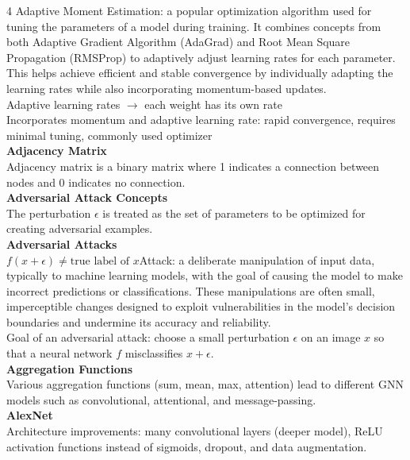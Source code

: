 \documentclass[8pt]{extarticle}
\begin{document}
\begin{multicols}{4}
Adaptive Moment Estimation: a popular optimization algorithm used for tuning the parameters of a model during training. It combines concepts from both Adaptive Gradient Algorithm (AdaGrad) and Root Mean Square Propagation (RMSProp) to adaptively adjust learning rates for each parameter. This helps achieve efficient and stable convergence by individually adapting the learning rates while also incorporating momentum-based updates.\\
Adaptive learning rates $\rightarrow$ each weight has its own rate\\
Incorporates momentum and adaptive learning rate: rapid convergence, requires minimal tuning, commonly used optimizer\\
\vspace{2pt}\textbf{Adjacency Matrix}\\
Adjacency matrix is a binary matrix where 1 indicates a connection between nodes and 0 indicates no connection.\\
\vspace{2pt}\textbf{Adversarial Attack Concepts}\\
The perturbation $\epsilon$ is treated as the set of parameters to be optimized for creating adversarial examples.\\
\vspace{2pt}\textbf{Adversarial Attacks}\\
$f(x + \epsilon) \neq \text{true label of } x$\Adversarial Attack: a deliberate manipulation of input data, typically to machine learning models, with the goal of causing the model to make incorrect predictions or classifications. These manipulations are often small, imperceptible changes designed to exploit vulnerabilities in the model's decision boundaries and undermine its accuracy and reliability.\\
Goal of an adversarial attack: choose a small perturbation $\epsilon$ on an image $x$ so that a neural network $f$ misclassifies $x+\epsilon$.\\
\vspace{2pt}\textbf{Aggregation Functions}\\
Various aggregation functions (sum, mean, max, attention) lead to different GNN models such as convolutional, attentional, and message-passing.\\
\vspace{2pt}\textbf{AlexNet}\\
Architecture improvements: many convolutional layers (deeper model), ReLU activation functions instead of sigmoids, dropout, and data augmentation.\\

\end{multicols}
\end{document}
